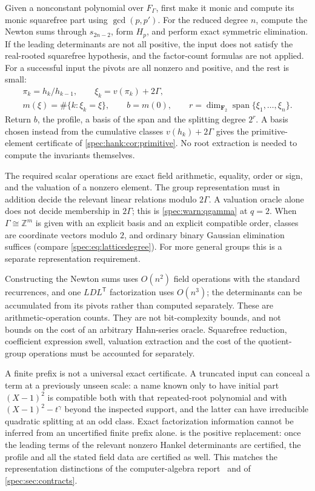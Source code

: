 \documentclass[11pt,a4paper]{article}
\numberwithin{equation}{section}
\theoremstyle{definition}
\theoremstyle{remark}
\newcommand{\Z}{\mathbb Z}
\newcommand{\Span}{\operatorname{span}}
\begin{document}
Given a nonconstant polynomial over $F_\Gamma$, first make it monic and compute
its monic squarefree part using $\gcd(p,p')$. For the reduced degree $n$,
compute the Newton sums through $s_{2n-2}$, form $H_p$, and perform exact
symmetric elimination. If the leading determinants are not all positive, the
input does not satisfy the real-rooted squarefree hypothesis, and the
factor-count formulas are not applied. For a successful input the pivots are
all nonzero and positive, and the rest is small:
\begin{equation}\label{spec:hank:eq:algorithm}
 \begin{gathered}
 \pi_k=h_k/h_{k-1},\qquad
 \xi_k=v(\pi_k)+2\Gamma,\\
 m(\xi)=\#\{k:\xi_k=\xi\},\qquad
 b=m(0),\qquad
 r=\dim_{\mathbf F_2}\Span\{\xi_1,\ldots,\xi_n\}.
 \end{gathered}
\end{equation}
Return $b$, the profile, a basis of the span and the splitting degree $2^r$.
A basis chosen instead from the cumulative classes $v(h_k)+2\Gamma$ gives the
primitive-element certificate of \cref{spec:hank:cor:primitive}. No root
extraction is needed to compute the invariants themselves.

The required scalar operations are exact field arithmetic, equality,
order or sign, and the valuation of a nonzero element. The group
representation must in addition decide the relevant linear relations modulo
$2\Gamma$. A valuation oracle alone does not decide membership in $2\Gamma$;
this is \cref{spec:warn:qgamma} at $q=2$. When $\Gamma\cong\Z^m$ is given with
an explicit basis and an explicit compatible order, classes are coordinate
vectors modulo $2$, and ordinary binary Gaussian elimination suffices (compare
\eqref{spec:eq:latticedegree}). For more general groups this is a separate
representation requirement.

Constructing the Newton sums uses $O(n^2)$ field operations with the standard
recurrences, and one $LDL^{\mathsf T}$ factorization uses $O(n^3)$; the
determinants can be accumulated from its pivots rather than computed
separately. These are arithmetic-operation counts. They are not bit-complexity
bounds, and not bounds on the cost of an arbitrary Hahn-series oracle.
Squarefree reduction, coefficient expression swell, valuation extraction and
the cost of the quotient-group operations must be accounted for separately.

A finite prefix is not a universal exact certificate. A truncated input can
conceal a term at a previously unseen scale: a name known only to have
initial part $(X-1)^2$ is compatible both with that repeated-root polynomial
and with $(X-1)^2-t^\gamma$ beyond the inspected support, and the latter can
have irreducible quadratic splitting at an odd class. Exact factorization
information cannot be inferred from an uncertified finite prefix alone.
 is the positive replacement: once the leading
terms of the relevant nonzero Hankel determinants are certified, the profile
and all the stated field data are certified as well. This matches the
representation distinctions of the computer-algebra report~\cite{RepoCAS}
and of \cref{spec:sec:contracts}.
\end{document}

